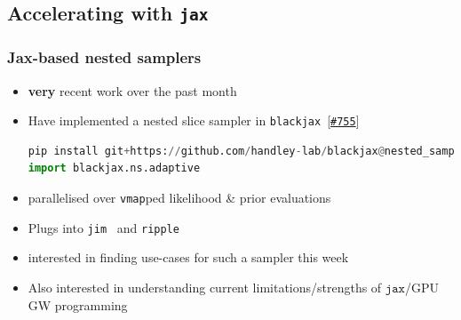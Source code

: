 \documentclass[aspectratio=169]{beamer}
\begin{document}
\subsection{Accelerating with \texttt{jax}}
\begin{frame}[fragile]
    \frametitle{Jax-based nested samplers}
    \begin{itemize}
        \item \textbf{very} recent work over the past month
        \item Have implemented a nested slice sampler in \texttt{blackjax}~[\textcolor{C0}{\texttt{\href{https://github.com/blackjax-devs/blackjax/pull/755}{\#755}}}]
\begin{lstlisting}[language=Python]
pip install git+https://github.com/handley-lab/blackjax@nested_sampling
import blackjax.ns.adaptive\end{lstlisting}
        \item parallelised over \texttt{vmap}ped likelihood \& prior evaluations
        \item Plugs into \texttt{jim}~ and \texttt{ripple}~
        \item interested in finding use-cases for such a sampler this week
        \item Also interested in understanding current limitations/strengths of $\texttt{jax}$/GPU GW programming
    \end{itemize}
\end{frame}
\end{document}

